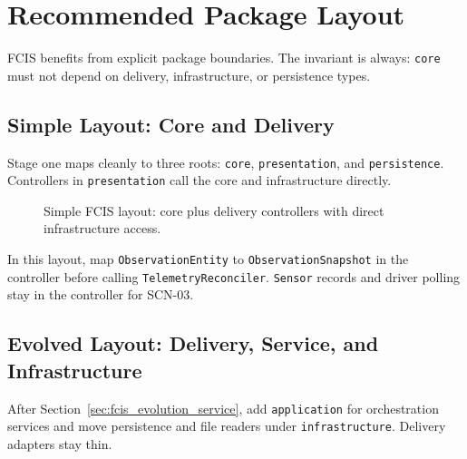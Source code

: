 \section{Recommended Package Layout}
\label{sec:fcis_package_layout}

FCIS benefits from explicit package boundaries. The invariant is always: \texttt{core} must not depend on delivery, infrastructure, or persistence types.

\subsection{Simple Layout: Core and Delivery}
\label{sec:fcis_package_layout_simple}

Stage one maps cleanly to three roots: \texttt{core}, \texttt{presentation}, and \texttt{persistence}. Controllers in \texttt{presentation} call the core and infrastructure directly.

\begin{figure}[htbp]
\centering
\begin{minipage}{0.85\textwidth}
\end{minipage}
\caption{Simple FCIS layout: core plus delivery controllers with direct infrastructure access.}
\label{fig:fcis_package_layout_simple}
\end{figure}

In this layout, map \texttt{ObservationEntity} to \texttt{ObservationSnapshot} in the controller before calling \texttt{TelemetryReconciler}. \texttt{Sensor} records and driver polling stay in the controller for SCN-03.

\subsection{Evolved Layout: Delivery, Service, and Infrastructure}
\label{sec:fcis_package_layout_evolved}

After Section~\ref{sec:fcis_evolution_service}, add \texttt{application} for orchestration services and move persistence and file readers under \texttt{infrastructure}. Delivery adapters stay thin.


